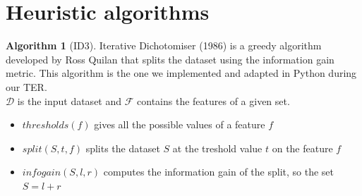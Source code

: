 \documentclass[12pt]{report}
\theoremstyle{definition}
\theoremstyle{definition}
\newtheorem*{algo}{Algorithm}
\theoremstyle{definition}
\begin{document}
\section{Heuristic algorithms}
\begin{algo}[ID3]
    Iterative Dichotomiser (1986) is a greedy algorithm developed by Ross Quilan that splits the dataset
    using the information gain metric. This algorithm is the one we implemented and adapted in Python during
    our TER.\\
    $\mathcal{D}$ is the input dataset and $\mathcal{F}$ contains the features of a given set.

\begin{algorithm}
    \caption{ID3}\label{alg:two}
    \DontPrintSemicolon

    \;
    \;

\end{algorithm}

\begin{itemize}
    \item $thresholds(f)$ gives all the possible values of a feature $f$
    \item $split(S, t, f)$ splits the dataset $S$ at the treshold value $t$ on the feature $f$
    \item $infogain(S, l, r)$ computes the information gain of the split, so the set $S=l+r$ 
\end{itemize}
\end{algo}
\end{document}
